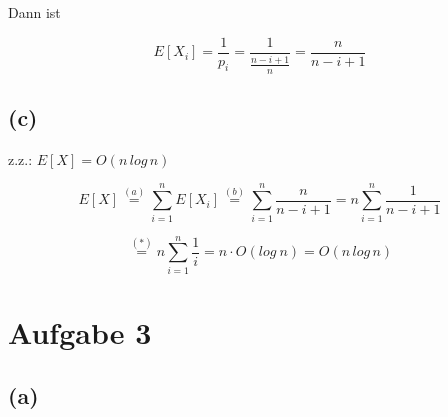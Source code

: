 \documentclass[11pt,a4paper,ngerman]{article}
\begin{document}
Dann ist

\[
E[X_{i}]=\frac{1}{p_{i}}=\frac{1}{\frac{n-i+1}{n}}=\frac{n}{n-i+1}
\]

\subsection*{(c)}


z.z.: $E[X]=O(n\, log\, n)$

\[
E[X]\stackrel{(a)}{=}\sum_{i=1}^{n}E[X_{i}]\stackrel{(b)}{=}\sum_{i=1}^{n}\frac{n}{n-i+1}=n\sum_{i=1}^{n}\frac{1}{n-i+1}
\]


\[
\stackrel{(*)}{=}n\sum_{i=1}^{n}\frac{1}{i}=n\cdot O(log\: n)=O(n\, log\, n)
\]


\section*{Aufgabe 3}

\subsection*{(a)}
\end{document}
